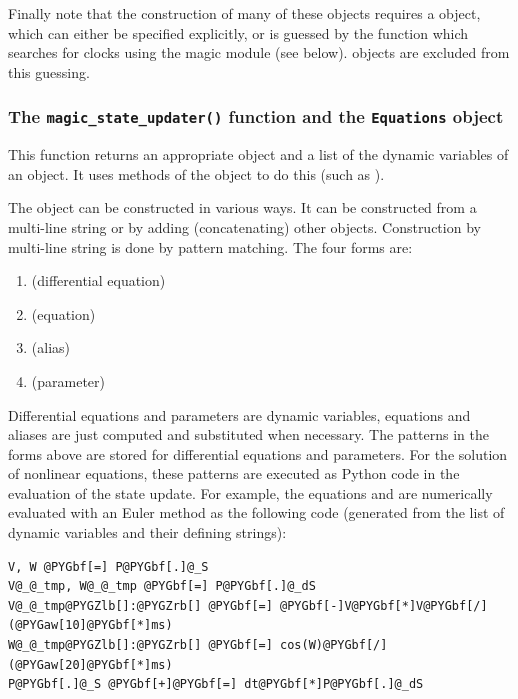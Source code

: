 \documentclass[letterpaper,10pt,english]{manual}
\begin{document}
Finally note that the construction of many of these objects requires a
 object, which can either be specified explicitly, or is guessed
by the  function which searches for clocks using the magic
module (see below).  objects are excluded from this guessing.


\subsubsection{The \texttt{magic\_state\_updater()} function and the \texttt{Equations} object}

This function returns an appropriate  object and a list of
the dynamic variables of an  object. It uses methods of the
 object to do this (such as ).

The  object can be constructed in various ways. It can be
constructed from a multi-line string or by adding (concatenating) other
 objects. Construction by multi-line string is done by
pattern matching. The four forms are:
\begin{enumerate}
\item {} 
 (differential equation)

\item {} 
 (equation)

\item {} 
 (alias)

\item {} 
 (parameter)

\end{enumerate}

Differential equations and parameters are dynamic variables, equations and
aliases are just computed and substituted when necessary. The  patterns in
the forms above are stored for differential equations and parameters. For the
solution of nonlinear equations, these  patterns are executed as Python
code in the evaluation of the state update. For example, the equations
 and  are
numerically evaluated with an Euler method
as the following code (generated from the list of dynamic variables and their
defining strings):

\begin{Verbatim}[commandchars=@\[\]]
V, W @PYGbf[=] P@PYGbf[.]@_S
V@_@_tmp, W@_@_tmp @PYGbf[=] P@PYGbf[.]@_dS
V@_@_tmp@PYGZlb[]:@PYGZrb[] @PYGbf[=] @PYGbf[-]V@PYGbf[*]V@PYGbf[/](@PYGaw[10]@PYGbf[*]ms)
W@_@_tmp@PYGZlb[]:@PYGZrb[] @PYGbf[=] cos(W)@PYGbf[/](@PYGaw[20]@PYGbf[*]ms)
P@PYGbf[.]@_S @PYGbf[+]@PYGbf[=] dt@PYGbf[*]P@PYGbf[.]@_dS
\end{Verbatim}
\end{document}
